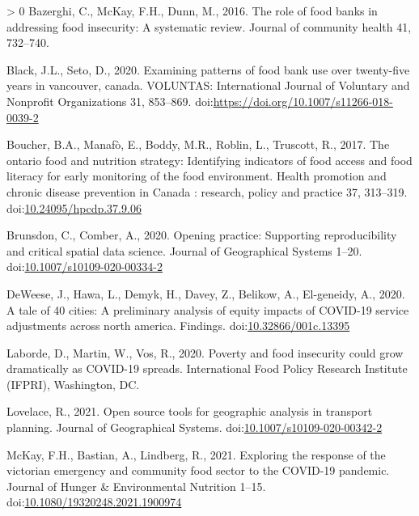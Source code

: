 \documentclass[]{elsarticle} %
\newlength{\cslhangindent}
\newenvironment{CSLReferences}[3] %
 {%
  \setlength{\parindent}{0pt}
  \ifodd #1 \everypar{\setlength{\hangindent}{\cslhangindent}}\ignorespaces\fi
  \ifnum #2 > 0
  \setlength{\parskip}{#2\baselineskip}
  \fi
 }%
 {}
\begin{document}
\hypertarget{refs}{}
\begin{CSLReferences}{1}{0}
\leavevmode\hypertarget{ref-bazerghi2016role}{}%
Bazerghi, C., McKay, F.H., Dunn, M., 2016. The role of food banks in
addressing food insecurity: A systematic review. Journal of community
health 41, 732--740.

\leavevmode\hypertarget{ref-black2020examining}{}%
Black, J.L., Seto, D., 2020. Examining patterns of food bank use over
twenty-five years in vancouver, canada. VOLUNTAS: International Journal
of Voluntary and Nonprofit Organizations 31, 853--869.
doi:\url{https://doi.org/10.1007/s11266-018-0039-2}

\leavevmode\hypertarget{ref-boucher2017ontario}{}%
Boucher, B.A., Manafò, E., Boddy, M.R., Roblin, L., Truscott, R., 2017.
The ontario food and nutrition strategy: Identifying indicators of food
access and food literacy for early monitoring of the food environment.
Health promotion and chronic disease prevention in Canada : research,
policy and practice 37, 313--319.
doi:\href{https://doi.org/10.24095/hpcdp.37.9.06}{10.24095/hpcdp.37.9.06}

\leavevmode\hypertarget{ref-brunsdon2020opening}{}%
Brunsdon, C., Comber, A., 2020. Opening practice: Supporting
reproducibility and critical spatial data science. Journal of
Geographical Systems 1--20.
doi:\href{https://doi.org/10.1007/s10109-020-00334-2}{10.1007/s10109-020-00334-2}

\leavevmode\hypertarget{ref-deweese2020tale}{}%
DeWeese, J., Hawa, L., Demyk, H., Davey, Z., Belikow, A., El-geneidy,
A., 2020. A tale of 40 cities: A preliminary analysis of equity impacts
of COVID-19 service adjustments across north america. Findings.
doi:\href{https://doi.org/10.32866/001c.13395}{10.32866/001c.13395}

\leavevmode\hypertarget{ref-laborde2020poverty}{}%
Laborde, D., Martin, W., Vos, R., 2020. Poverty and food insecurity
could grow dramatically as COVID-19 spreads. International Food Policy
Research Institute (IFPRI), Washington, DC.

\leavevmode\hypertarget{ref-lovelace2021open}{}%
Lovelace, R., 2021. Open source tools for geographic analysis in
transport planning. Journal of Geographical Systems.
doi:\href{https://doi.org/10.1007/s10109-020-00342-2}{10.1007/s10109-020-00342-2}

\leavevmode\hypertarget{ref-mckay2021exploring}{}%
McKay, F.H., Bastian, A., Lindberg, R., 2021. Exploring the response of
the victorian emergency and community food sector to the COVID-19
pandemic. Journal of Hunger \& Environmental Nutrition 1--15.
doi:\href{https://doi.org/10.1080/19320248.2021.1900974}{10.1080/19320248.2021.1900974}


\end{CSLReferences}
\end{document}
